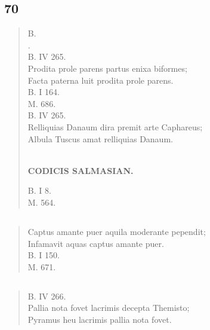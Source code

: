 \documentclass[11pt, a4paper]{report}
\begin{document}
            \subsection*{70}
      \begin{verse}
      B. \\ . \\ B. IV 265. \\ Prodita prole parens partus enixa biformes; \\ Facta paterna luit prodita prole parens. \\ B. I 164. \\ M. 686. \\ B. IV 265. \\ Relliquias Danaum dira premit arte Caphareus; \\ Albula Tuscus amat relliquias Danaum. \\ 
        ﻿\pagebreak 
    \begin{center} \textbf{CODICIS SALMASIAN.} \end{center} \marginpar{[109]} B. I 8. \\ M. 564. \\ 
      \end{verse}
  
            \subsection*{}
      \begin{verse}
      Captus amante puer aquila moderante pependit; \\ Infamavit aquas captus amante puer. \\ B. I 150. \\ M. 671. \\ 
      \end{verse}
  
            \subsection*{}
      \begin{verse}
      B. IV 266. \\ Pallia nota fovet lacrimis decepta Themisto; \\ Pyramus heu lacrimis pallia nota fovet. \\ 
      \end{verse}
  
\end{document}
